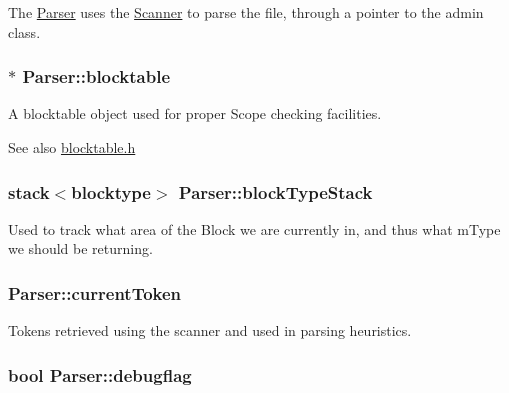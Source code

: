 The \hyperlink{classParser}{Parser} uses the \hyperlink{classScanner}{Scanner} to parse the file, through a pointer to the admin class. 

\hypertarget{classParser_a817d3fe67a8ee070f01fd759f8d5d30f}{
\subsubsection[{blocktable}]{$\ast$ {\bf Parser::blocktable}}}
\label{classParser_a817d3fe67a8ee070f01fd759f8d5d30f}


A blocktable object used for proper Scope checking facilities. 

\begin{DoxySeeAlso}{See also}
\hyperlink{blocktable_8h}{blocktable.h} 
\end{DoxySeeAlso}
\hypertarget{classParser_ae9c8fcaf225a1d019fc1e87ee330605c}{
\subsubsection[{blockTypeStack}]{\setlength{\rightskip}{0pt plus 5cm}stack$<${\bf blocktype}$>$ {\bf Parser::blockTypeStack}}}
\label{classParser_ae9c8fcaf225a1d019fc1e87ee330605c}


Used to track what area of the Block we are currently in, and thus what mType we should be returning. 

\hypertarget{classParser_a8180cecab442c4c7f582bbe1d0682bf1}{
\subsubsection[{currentToken}]{ {\bf Parser::currentToken}}}
\label{classParser_a8180cecab442c4c7f582bbe1d0682bf1}


Tokens retrieved using the scanner and used in parsing heuristics. 

\hypertarget{classParser_a090a56f54cfd45240a039863b8289581}{
\subsubsection[{debugflag}]{\setlength{\rightskip}{0pt plus 5cm}bool {\bf Parser::debugflag}}}
\label{classParser_a090a56f54cfd45240a039863b8289581}


